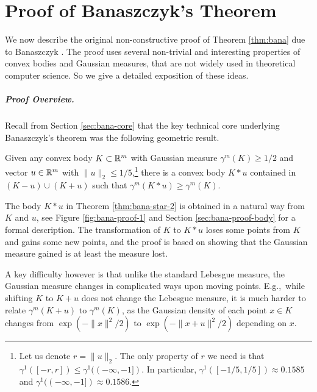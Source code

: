 

\chapter{Proof of Banaszczyk's Theorem}
\label{ch:bana-proof}
We now describe the original non-constructive proof of  Theorem \ref{thm:bana} due to Banaszczyk \cite{Bana98}. 
The proof uses several non-trivial and interesting properties of convex bodies and Gaussian measures, that are not widely used in theoretical computer science. So we give a detailed exposition of these ideas.



\paragraph{Proof Overview.}

Recall from Section \ref{sec:bana-core} that the key technical core underlying Banaszczyk's theorem was the following geometric result.

\begin{theorem}
\label{thm:bana-star-2}
Given any convex body $K \subset \mathbb{R}^m$ with Gaussian measure $\gamma^m(K) \geq 1/2$ and vector $u \in \mathbb{R}^m$ with $\|u\|_2 \leq 1/5$,\footnote{   Let us denote $r = \|u\|_2$. The only property of $r$ we need is that $\gamma^1([-r,r]) \leq \gamma^1((-\infty,-1])$.
%       
 In particular, $\gamma^1([-1/5,1/5])\approx0.1585$ and $\gamma^1((-\infty,-1]) \approx 0.1586$.} there is a convex body 
$K*u$ contained in $(K-u) \cup (K+u)$ such that $\gamma^m(K*u) \geq \gamma^m(K)$. 
\end{theorem}

 


The body $K*u$ in Theorem \ref{thm:bana-star-2} is obtained in a natural way from $K$ and $u$, see Figure \ref{fig:bana-proof-1} and Section \ref{sec:bana-proof-body} for a formal description.
The transformation of $K$ to $K*u$ loses some points from $K$ and gains some new points, and the proof is based on showing that the Gaussian measure gained is at least the measure lost.

A key difficulty however is that unlike the standard Lebesgue measure, the Gaussian measure changes in complicated ways upon moving points. E.g.,~while shifting $K$ to $K+u$ does not change the Lebesgue measure, it is much harder to relate $\gamma^m(K+u)$ to $\gamma^m(K)$, 
as the Gaussian density of each point $x \in K$ changes from $\exp(-\|x\|^2/2)$ to $\exp(-\|x+u\|^2/2)$  depending on $x$. 

